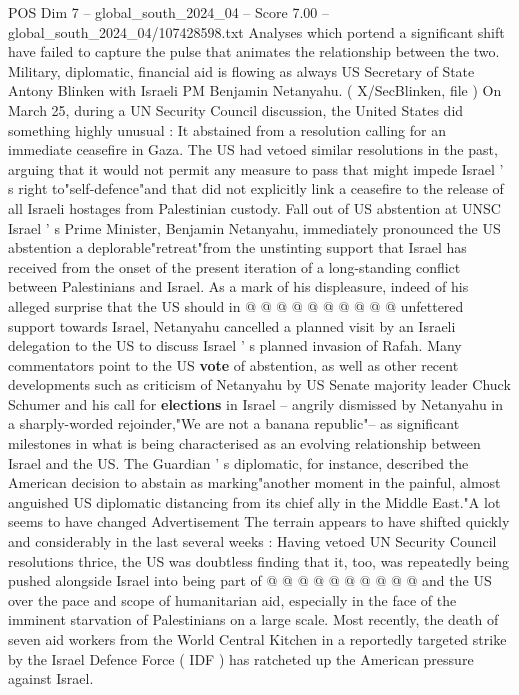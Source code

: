 \begin{textsample}{POS Dim 7 – global\_south\_2024\_04 – Score 7.00 – global\_south\_2024\_04/107428598.txt}  \label{ex:f7_pos_169}
Analyses which portend a significant shift have failed to capture the pulse that animates the relationship between the two.
Military, diplomatic, financial aid is flowing as always US Secretary of State Antony Blinken with Israeli PM Benjamin Netanyahu. ( X/SecBlinken, file ) On March 25, during a UN Security Council discussion, the United States did something highly unusual : It abstained from a resolution calling for an immediate ceasefire in Gaza.
The US had vetoed similar resolutions in the past, arguing that it would not permit any measure to pass that might impede Israel ' s right to"self-defence"and that did not explicitly link a ceasefire to the release of all Israeli hostages from Palestinian custody.
Fall out of US abstention at UNSC Israel ' s Prime Minister, Benjamin Netanyahu, immediately pronounced the US abstention a deplorable"retreat"from the unstinting support that Israel has received from the onset of the present iteration of a long-standing conflict between Palestinians and Israel.
As a mark of his displeasure, indeed of his alleged surprise that the US should in @ @ @ @ @ @ @ @ @ @ unfettered support towards Israel, Netanyahu cancelled a planned visit by an Israeli delegation to the US to discuss Israel ' s planned invasion of Rafah.
Many commentators point to the US \textbf{vote} of abstention, as well as other recent developments such as criticism of Netanyahu by US Senate majority leader Chuck Schumer and his call for \textbf{elections} in Israel -- angrily dismissed by Netanyahu in a sharply-worded rejoinder,"We are not a banana republic"-- as significant milestones in what is being characterised as an evolving relationship between Israel and the US.
The Guardian ' s diplomatic, for instance, described the American decision to abstain as marking"another moment in the painful, almost anguished US diplomatic distancing from its chief ally in the Middle East."A lot seems to have changed Advertisement The terrain appears to have shifted quickly and considerably in the last several weeks : Having vetoed UN Security Council resolutions thrice, the US was doubtless finding that it, too, was repeatedly being pushed alongside Israel into being part of @ @ @ @ @ @ @ @ @ @ and the US over the pace and scope of humanitarian aid, especially in the face of the imminent starvation of Palestinians on a large scale.
Most recently, the death of seven aid workers from the World Central Kitchen in a reportedly targeted strike by the Israel Defence Force ( IDF ) has ratcheted up the American pressure against Israel.

\end{textsample}
